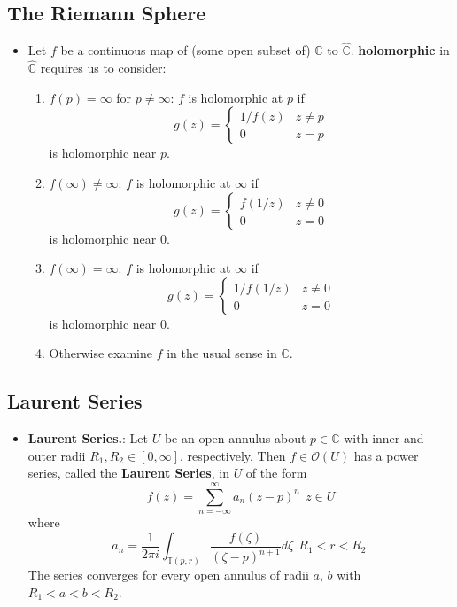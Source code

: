\documentclass{article}
\newenvironment{topic}[1]{%
{\subsection{#1}}%
\begin{itemize}%
}{%
\end{itemize}%
}
\newcommand{\theorem}[1]{\item {\bf #1.}}
\newcommand{\term}[1]{{\bf #1}}
\newcommand{\holo}[1]{\mathcal{O}(#1)}
\newcommand{\remark}{\item}
\newcommand{\sphere}[2]{\mathbb{T}{(#1, #2)}}
\begin{document}
\begin{topic}{The Riemann Sphere}
\remark Let $f$ be a continuous map of (some open subset of) $\hat{\mathbb{C}}$ to $\hat{\mathbb{C}}$. \term{holomorphic} in $\hat{\mathbb{C}}$ requires us to consider: \begin{enumerate}
\item $f(p) = \infty$ for $p \neq \infty$: $f$ is holomorphic at $p$ if $$g(z) = \begin{cases}
1/f(z)&z \neq p\\[10pt]
0&z = p
\end{cases}$$ is holomorphic near $p$.

\item $f(\infty) \neq \infty$: $f$ is holomorphic at $\infty$ if $$g(z) = \begin{cases}
f(1/z)&z \neq 0\\[10pt]
0&z = 0
\end{cases}$$ is holomorphic near $0$.

\item $f(\infty) = \infty$: $f$ is holomorphic at $\infty$ if $$g(z) = \begin{cases}
1/f(1/z)&z \neq 0\\[10pt]
0&z = 0
\end{cases}$$ is holomorphic near $0$.

\item Otherwise examine $f$ in the usual sense in $\mathbb{C}$.
\end{enumerate}

\end{topic}


\begin{topic}{Laurent Series}

\theorem{Laurent Series}: Let $U$ be an open annulus about $p \in \mathbb{C}$ with inner and outer radii $R_1, R_2 \in [0, \infty]$, respectively. Then $f \in \holo{U}$ has a power series, called the \term{Laurent Series}, in $U$ of the form $$f(z) = \sum_{n=-\infty}^\infty a_n (z - p)^n~~z \in U$$ where $$a_n = \dfrac{1}{2 \pi i} \int_{\sphere{p}{r}} \dfrac{f(\zeta)}{(\zeta - p)^{n+1}} d\zeta~~R_1 < r < R_2.$$ The series converges for every open annulus of radii $a$, $b$ with $R_1 < a < b < R_2$.

\end{topic}
\end{document}
